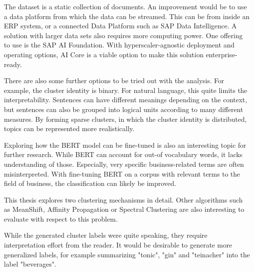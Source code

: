The dataset is a static collection of documents. An improvement would be to use a data platform from which the data can be streamed. This can be from inside an \ac{ERP} system, or a connected Data Platform such as SAP Data Intelligence. A solution with larger data sets also requires more computing power. One offering to use is the SAP AI Foundation. With hyperscaler-agnostic deployment and operating options, AI Core is a viable option to make this solution enterprise-ready.

There are also some further options to be tried out with the analysis. For example, the cluster identity is binary. For natural language, this quite limits the interpretability. Sentences can have different meanings depending on the context, but sentences can also be grouped into logical units according to many different measures. By forming sparse clusters, in which the cluster identity is distributed, topics can be represented more realistically. 

Exploring how the \ac{BERT} model can be fine-tuned is also an interesting topic for further research. While \ac{BERT} can account for out-of vocabulary words, it lacks understanding of those. Especially, very specific business-related terms are often misinterpreted. With fine-tuning \ac{BERT} on a corpus with relevant terms to the field of business, the classification can likely be improved.

This thesis explores two clustering mechanisms in detail. Other algorithms such as MeanShift, Affinity Propagation or Spectral Clustering are also interesting to evaluate with respect to this problem.

While the generated cluster labels were quite speaking, they require interpretation effort from the reader. It would be desirable to generate more generalized labels, for example summarizing "tonic", "gin" and "teinacher" into the label "beverages".





